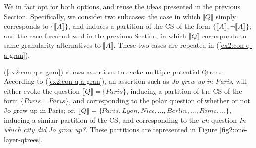 We in fact opt for both options, and reuse the ideas presented in the previous Section. Specifically, we consider two subcases: the case in which $\llbracket Q \rrbracket$ simply corresponds to $\lbrace \llbracket A \rrbracket \rbrace$, and induces a partition of the CS of the form $\lbrace \llbracket A \rrbracket, \neg\llbracket A \rrbracket \rbrace$; and the case foreshadowed in the previous Section, in which $\llbracket Q \rrbracket$ corresponds to same-granularity alternatives to $\llbracket A \rrbracket$. These two cases are repeated in (\ref{ex2:con-q-a-gran}).

\begin{exe}
	\label{ex2:con-q-a-gran}
\end{exe}


(\ref{ex2:con-q-a-gran}) allows assertions to evoke multiple potential Qtrees. According to (\ref{ex2:con-q-a-gran}), an assertion such as \textit{Jo grew up in Paris}, will either evoke the question $\llbracket Q \rrbracket = \lbrace \textit{Paris} \rbrace$, inducing a partition of the CS of the form $\lbrace \textit{Paris}, \neg\textit{Paris}\rbrace$, and corresponding to the polar question of whether or not Jo grew up in Paris; or, $\llbracket Q \rrbracket = \lbrace \textit{Paris}, \textit{Lyon}, \textit{Nice}, ..., \textit{Berlin}, ..., \textit{Rome}, ... \rbrace$, inducing a similar partition of the CS, and corresponding to the \textit{wh}-question \textit{In which city did Jo grow up?}. These partitions are represented in Figure \ref{fig2:one-layer-qtrees}. 

